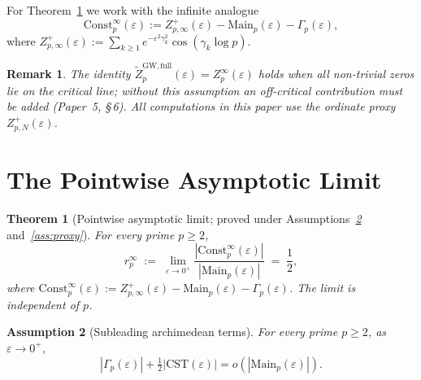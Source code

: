 \documentclass[11pt]{article}
\newtheorem{theorem}{Theorem}[section]
\newtheorem{assumption}[theorem]{Assumption}
\newtheorem*{remark}{Remark}
\begin{document}
For Theorem~\ref{thm:rpinf} we work with the infinite analogue
\[
\mathrm{Const}_p^\infty(\varepsilon)
  := Z_{p,\infty}^+(\varepsilon) - \mathrm{Main}_p(\varepsilon)
     - \Gamma_p(\varepsilon),
\]
where $Z_{p,\infty}^+(\varepsilon):=\sum_{k\ge 1}
e^{-\varepsilon^2\gamma_k^2}\cos(\gamma_k\log p)$.

\begin{remark}
The identity $\widetilde Z_p^{\mathrm{GW,full}}(\varepsilon)=Z_p^\infty(\varepsilon)$
holds when all non-trivial zeros lie on the critical line; without
this assumption an off-critical contribution must be added (Paper~5, \S\,6).
All computations in this paper use the ordinate proxy $Z_{p,N}^+(\varepsilon)$.
\end{remark}

\section{The Pointwise Asymptotic Limit}
\label{sec:rpinf}

\begin{theorem}[Pointwise asymptotic limit; proved under
                 Assumptions~\emph{\ref{ass:subleading}} and~\emph{\ref{ass:proxy}}]
\label{thm:rpinf}
For every prime $p\ge 2$,
\[
r_p^\infty \;:=\; \lim_{\varepsilon\to 0^+}
  \frac{|\mathrm{Const}_p^\infty(\varepsilon)|}
       {|\mathrm{Main}_p(\varepsilon)|}
  \;=\; \frac{1}{2},
\]
where $\mathrm{Const}_p^\infty(\varepsilon):=Z_{p,\infty}^+(\varepsilon)
-\mathrm{Main}_p(\varepsilon)-\Gamma_p(\varepsilon)$.
The limit is independent of $p$.
\end{theorem}

\begin{assumption}[Subleading archimedean terms]
\label{ass:subleading}
For every prime $p\ge 2$, as $\varepsilon\to0^+$,
\[
  |\Gamma_p(\varepsilon)|
  +\tfrac12|\mathrm{CST}(\varepsilon)|
  = o\!\left(|\mathrm{Main}_p(\varepsilon)|\right).
\]
\end{assumption}
\end{document}
